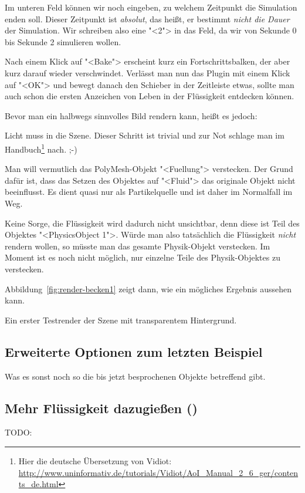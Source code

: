 \documentclass[10pt,DIV=14,a4paper]{scrartcl}
\begin{document}
\itE

Im unteren Feld können wir noch eingeben, zu welchem Zeitpunkt die
Simulation enden soll. Dieser Zeitpunkt ist \emph{absolut}, das heißt,
er bestimmt \emph{nicht die Dauer} der Simulation. Wir schreiben also
eine "<2"> in das Feld, da wir von Sekunde 0 bis Sekunde 2 simulieren
wollen.

Nach einem Klick auf "<Bake"> erscheint kurz ein Fortschrittsbalken, der
aber kurz darauf wieder verschwindet. Verlässt man nun das Plugin mit
einem Klick auf "<OK"> und bewegt danach den Schieber in der Zeitleiste
etwas, sollte man auch schon die ersten Anzeichen von Leben in der
Flüssigkeit entdecken können.

Bevor man ein halbwegs sinnvolles Bild rendern kann, heißt es jedoch:

\itA
	\item Licht muss in die Szene. Dieser Schritt ist trivial und zur
	Not schlage man im Handbuch\footnote{Hier die deutsche Übersetzung
	von Vidiot: \\
	\url{http://www.uninformativ.de/tutorials/Vidiot/AoI_Manual_2_6_ger/contents_de.html}}
	nach. ;-)

	\item Man will vermutlich das PolyMesh-Objekt "<Fuellung">
	verstecken. Der Grund dafür ist, dass das Setzen des Objektes auf
	"<Fluid"> das originale Objekt nicht beeinflusst. Es dient quasi nur
	als Partikelquelle und ist daher im Normalfall im Weg.

	Keine Sorge, die Flüssigkeit wird dadurch nicht unsichtbar, denn
	diese ist Teil des Objektes "<PhysicsObject 1">. Würde man also
	tatsächlich die Flüssigkeit \emph{nicht} rendern wollen, so müsste
	man das gesamte Physik-Objekt verstecken. Im Moment ist es noch
	nicht möglich, nur einzelne Teile des Physik-Objektes zu verstecken.

\itE

Abbildung~\ref{fig:render-becken1} zeigt dann, wie ein mögliches
Ergebnis aussehen kann.

{Ein erster Testrender der Szene mit transparentem Hintergrund.}

\subsection{Erweiterte Optionen zum letzten Beispiel}
Was es sonst noch so die bis jetzt besprochenen Objekte betreffend gibt.

\subsection{Mehr Flüssigkeit dazugießen ()}
TODO:
\end{document}
